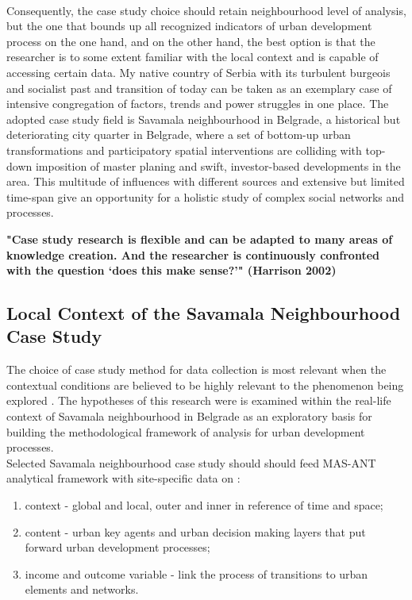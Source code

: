 \documentclass[11pt]{report}
\begin{document}
\\
Consequently, the case study choice should retain neighbourhood level of analysis, but the one that bounds up all recognized indicators of urban development process on the one hand, and on the other hand, the best option is that the  researcher  is  to  some  extent  familiar  with  the  local  context and  is capable of accessing certain data.  My native country of Serbia with its turbulent  burgeois and socialist past and transition of today can be taken as an exemplary case of intensive congregation of factors, trends and power struggles in one place. The adopted case study field is Savamala neighbourhood in Belgrade, a historical but deteriorating city quarter in Belgrade, where a set of bottom-up urban transformations and participatory spatial interventions are colliding with top-down imposition of master planing and swift, investor-based developments in the area. This multitude of influences with different sources and extensive but limited time-span give an opportunity for a holistic study of complex social networks and processes. 

\textbf{"Case study research is flexible and can be adapted to many areas of knowledge creation. And the researcher is continuously confronted with the question ‘does this make sense?’" (Harrison 2002)}

\subsection{Local Context of the Savamala Neighbourhood Case Study}

The choice of case study method for data collection is most relevant when
the  contextual  conditions  are  believed  to  be highly relevant to the phenomenon being explored . The hypotheses of this research were is examined within the real-life context of Savamala neighbourhood in Belgrade as an exploratory basis for building the methodological framework of analysis for urban development processes. 
\\
Selected Savamala neighbourhood case study should should feed MAS-ANT analytical framework with site-specific data on :
\begin{enumerate}
\item context - global and local, outer and inner in reference of time and space;
\item content - urban key agents and urban decision making layers that put forward urban development processes;
\item income and outcome variable - link the process of transitions to urban elements and networks.
\end{enumerate}
\end{document}
